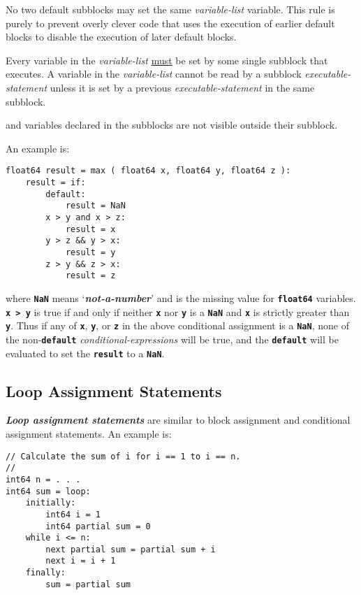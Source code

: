 \documentclass[12pt]{article}
\newcommand{\TT}[1]{{\tt \bfseries #1}}
\newcommand{\key}[1]{{\bf \em #1}\index{#1}}
\newcommand{\ikey}[2]{{\bf \em #1}\index{#2}}
\newenvironment{indpar}[1][0.3in]%
	{\begin{list}{}%
		     {\setlength{\itemsep}{0in}%
		      \setlength{\topsep}{0in}%
		      \setlength{\parsep}{1ex}%
		      \setlength{\labelwidth}{#1}%
		      \setlength{\leftmargin}{#1}%
		      \addtolength{\leftmargin}{\labelsep}}%
	 \item}%
	{\end{list}}
\begin{document}
No two default subblocks may set the same {\em variable-list}
variable.  This rule is purely to prevent overly clever code that
uses the execution of earlier default blocks to disable the
execution of later default blocks.

Every variable in the {\em variable-list} \underline{must} be set by some
single subblock that executes.  A variable in the
{\em variable-list} cannot be read by a subblock {\em executable-statement}
unless it is set by a previous {\em executable-statement} in the
same subblock.

and variables declared in the subblocks are not visible outside their
subblock.

An example is:
\begin{indpar}\begin{verbatim}
float64 result = max ( float64 x, float64 y, float64 z ):
    result = if:
        default:
            result = NaN
        x > y and x > z:
            result = x
        y > z && y > x:
            result = y
        z > y && z > x:
            result = z
\end{verbatim}\end{indpar}

where \TT{NaN} means `\key{not-a-number}' and is the missing
value for \TT{float64} variables.  \TT{x~>~y} is true if
and only if neither \TT{x} nor \TT{y} is a \TT{NaN} and
\TT{x} is strictly greater than \TT{y}.  Thus if any of
\TT{x}, \TT{y}, or \TT{z} in the above conditional assignment
is a \TT{NaN}, none of the non-\TT{default} {\em conditional-expressions}
will be true, and the \TT{default} will be evaluated to set
the \TT{result} to a \TT{NaN}.

\subsection{Loop Assignment Statements}
\label{LOOP-ASSIGNMENT-STATEMENTS}

\ikey{Loop assignment statements}{loop assignment}
are similar to block assignment
and conditional assignment statements.  An example is:
\begin{indpar}\begin{verbatim}
// Calculate the sum of i for i == 1 to i == n.
//
int64 n = . . .
int64 sum = loop:
    initially:
        int64 i = 1
        int64 partial sum = 0
    while i <= n:
        next partial sum = partial sum + i
        next i = i + 1
    finally:
        sum = partial sum
\end{verbatim}\end{indpar}
\end{document}
